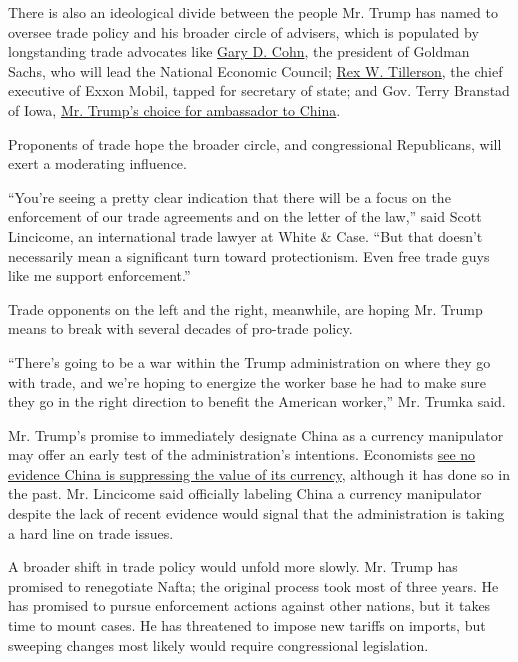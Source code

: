 There is also an ideological divide between the people Mr. Trump has
named to oversee trade policy and his broader circle of advisers, which
is populated by longstanding trade advocates like
\href{https://www.nytimes.com/2016/12/12/business/dealbook/goldman-sachs-gary-cohn.html}{Gary
D. Cohn}, the president of Goldman Sachs, who will lead the National
Economic Council;
\href{https://www.nytimes.com/2016/12/12/us/politics/rex-tillerson-secretary-of-state-trump.html}{Rex
W. Tillerson}, the chief executive of Exxon Mobil, tapped for secretary
of state; and Gov. Terry Branstad of Iowa,
\href{http://www.nytimes.com/2016/12/07/us/politics/terry-branstad-china-ambassador-trump.html?_r=0}{Mr.
Trump's choice for ambassador to China}.

Proponents of trade hope the broader circle, and congressional
Republicans, will exert a moderating influence.

``You're seeing a pretty clear indication that there will be a focus on
the enforcement of our trade agreements and on the letter of the law,''
said Scott Lincicome, an international trade lawyer at White \& Case.
``But that doesn't necessarily mean a significant turn toward
protectionism. Even free trade guys like me support enforcement.''

Trade opponents on the left and the right, meanwhile, are hoping Mr.
Trump means to break with several decades of pro-trade policy.

``There's going to be a war within the Trump administration on where
they go with trade, and we're hoping to energize the worker base he had
to make sure they go in the right direction to benefit the American
worker,'' Mr. Trumka said.

Mr. Trump's promise to immediately designate China as a currency
manipulator may offer an early test of the administration's intentions.
Economists
\href{http://www.nytimes.com/2016/10/01/business/dealbook/china-trump-yuan-devaluation.html}{see
no evidence China is suppressing the value of its currency}, although it
has done so in the past. Mr. Lincicome said officially labeling China a
currency manipulator despite the lack of recent evidence would signal
that the administration is taking a hard line on trade issues.

A broader shift in trade policy would unfold more slowly. Mr. Trump has
promised to renegotiate Nafta; the original process took most of three
years. He has promised to pursue enforcement actions against other
nations, but it takes time to mount cases. He has threatened to impose
new tariffs on imports, but sweeping changes most likely would require
congressional legislation.

